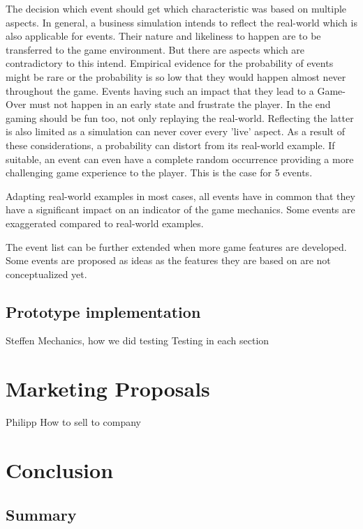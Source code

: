 \documentclass[11pt,titlepage,oneside,openany]{book}
\begin{document}
The decision which event should get which characteristic was based on multiple aspects. In general, a business simulation intends to reflect the real-world which is also applicable for events. Their nature and likeliness to happen are to be transferred to the game environment. But there are aspects which are contradictory to this intend. Empirical evidence for the probability of events might be rare or the probability is so low that they would happen almost never throughout the game. Events having such an impact that they lead to a Game-Over must not happen in an early state and frustrate the player. In the end gaming should be fun too, not only replaying the real-world. Reflecting the latter is also limited as a simulation can never cover every 'live' aspect. As a result of these considerations, a probability can distort from its real-world example. If suitable, an event can even have a complete random occurrence providing a more challenging game experience to the player. This is the case for 5 events. 



Adapting real-world examples in most cases, all events have in common that they have a significant impact on an indicator of the game mechanics. Some events are exaggerated compared to real-world examples. 

The event list can be further extended when more game features are developed. Some events are proposed as ideas as the features they are based on are not conceptualized yet.
\section{Prototype implementation}
Steffen
Mechanics, how we did testing
Testing in each section

\chapter{Marketing Proposals}
Philipp
\label{cha:exp}
\label{sec:setting}
How to sell to company


\chapter{Conclusion}
\label{cha:conclusion}


\section{Summary}
\label{sec:sum}
\end{document}
